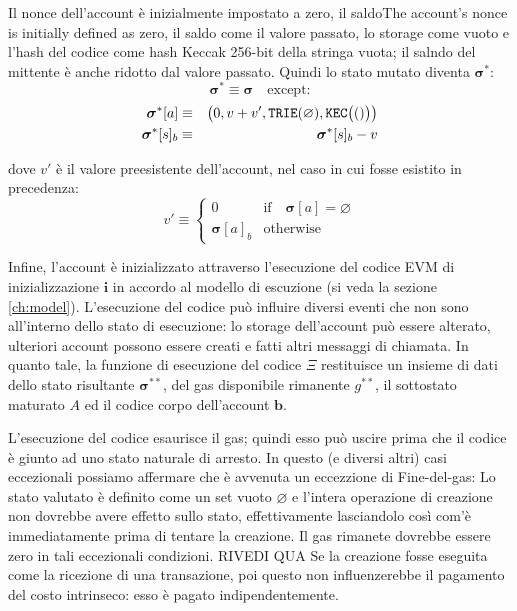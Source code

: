 \documentclass[9pt,oneside]{amsart}
\begin{document}
\begin{multicols}{2}
Il nonce dell'account è inizialmente impostato a zero, il saldoThe account's nonce is initially defined as zero, il saldo come il valore passato, lo storage come vuoto e l'hash del codice come hash Keccak 256-bit della stringa vuota; il salndo del mittente è anche ridotto dal valore passato. Quindi lo stato mutato diventa $\boldsymbol{\sigma}^*$:
\begin{equation}
\boldsymbol{\sigma}^* \equiv \boldsymbol{\sigma} \quad \text{except:}
\end{equation}
\begin{eqnarray}
\boldsymbol{\sigma}^*[a] &\equiv& \big( 0, v + v', \mathtt{\tiny TRIE}(\varnothing), \mathtt{\tiny KEC}\big(()\big) \big) \\
\boldsymbol{\sigma}^*[s]_b &\equiv& \boldsymbol{\sigma}^*[s]_b - v
\end{eqnarray}

dove $v'$ è il valore preesistente dell'account, nel caso in cui fosse esistito in precedenza:
\begin{equation}
v' \equiv \begin{cases}
0 & \text{if} \quad \boldsymbol{\sigma}[a] = \varnothing\\
\boldsymbol{\sigma}[a]_b & \text{otherwise}
\end{cases}
\end{equation}


Infine, l'account è inizializzato attraverso l'esecuzione del codice EVM di inizializzazione $\mathbf{i}$ in accordo al modello di escuzione (si veda la sezione \ref{ch:model}). L'esecuzione del codice può influire diversi eventi che non sono all'interno dello stato di esecuzione: lo storage dell'account può essere alterato, ulteriori account possono essere creati e fatti altri messaggi di chiamata. In quanto tale, la funzione di esecuzione del codice $\Xi$ restituisce un insieme di dati dello stato risultante $\boldsymbol{\sigma}^{**}$, del gas disponibile rimanente $g^{**}$, il sottostato maturato $A$ ed il codice corpo dell'account $\mathbf{b}$.

L'esecuzione del codice esaurisce il gas; quindi esso può uscire prima che il codice è giunto ad uno stato naturale di arresto. In questo (e diversi altri) casi eccezionali possiamo affermare che è avvenuta un eccezzione di Fine-del-gas: Lo stato valutato è definito come un set vuoto $\varnothing$ e l'intera operazione di creazione non dovrebbe avere effetto sullo stato, effettivamente lasciandolo così com'è immediatamente prima di tentare la creazione. Il gas rimanete dovrebbe essere zero in tali eccezionali condizioni. RIVEDI QUA Se la creazione fosse eseguita come la ricezione di una transazione, poi questo non influenzerebbe il pagamento del costo intrinseco: esso è pagato indipendentemente.


\end{multicols}
\end{document}
